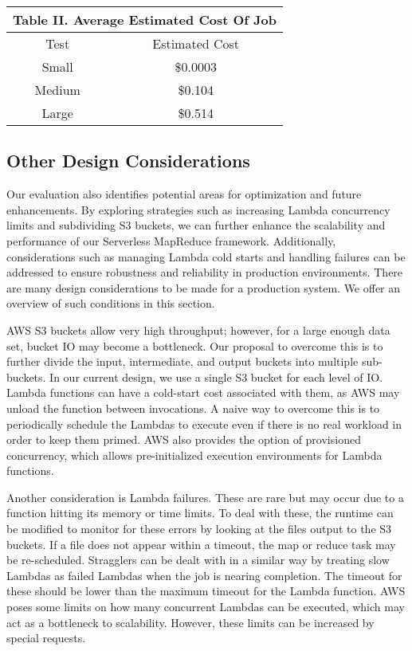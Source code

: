 \begin{table}[]
\centering
\begin{tabular}{|cc|}
\hline
\multicolumn{2}{|c|}{Table II. Average Estimated Cost Of Job} \\ \hline
\multicolumn{1}{|c|}{Test}           & Estimated Cost         \\ \hline
\multicolumn{1}{|c|}{Small}          & \$0.0003               \\
\multicolumn{1}{|c|}{Medium}         & \$0.104                \\
\multicolumn{1}{|c|}{Large}          & \$0.514                \\ \hline
\end{tabular}
\end{table}

\subsection{Other Design Considerations}

Our evaluation also identifies potential areas for optimization and future enhancements. By exploring strategies such as increasing Lambda concurrency limits and subdividing S3 buckets, we can further enhance the scalability and performance of our Serverless MapReduce framework. Additionally, considerations such as managing Lambda cold starts and handling failures can be addressed to ensure robustness and reliability in production environments.
There are many design considerations to be made for a production system. We offer an overview of such conditions in this section.

AWS S3 buckets allow very high throughput; however, for a large enough data set, bucket IO may become a bottleneck. Our proposal to overcome this is to further divide the input, intermediate, and output buckets into multiple sub-buckets. In our current design, we use a single S3 bucket for each level of IO. Lambda functions can have a cold-start cost associated with them, as AWS may unload the function between invocations. A naive way to overcome this is to periodically schedule the Lambdas to execute even if there is no real workload in order to keep them primed. AWS also provides the option of provisioned concurrency, which allows pre-initialized execution environments for Lambda functions.

Another consideration is Lambda failures. These are rare but may occur due to a function hitting its memory or time limits. To deal with these, the runtime can be modified to monitor for these errors by looking at the files output to the S3 buckets. If a file does not appear within a timeout, the map or reduce task may be re-scheduled. Stragglers can be dealt with in a similar way by treating slow Lambdas as failed Lambdas when the job is nearing completion. The timeout for these should be lower than the maximum timeout for the Lambda function. AWS poses some limits on how many concurrent Lambdas can be executed, which may act as a bottleneck to scalability. However, these limits can be increased by special requests.